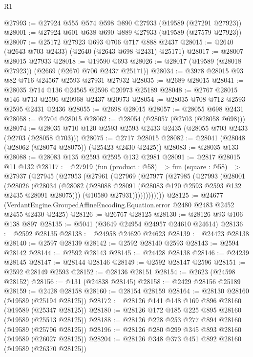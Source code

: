 \begin{lexlean}{R1}
\begin{coremodule}
@27993 := @27924 @555 @574 @598 @890 @27933 (@19589 (@27291 @27923))
@28001 := @27924 @601 @638 @690 @889 @27933 (@19589 (@27579 @27923))
@28007 := @25172 @27923 @693 @706 @717 @888 @2437
@28015 := @2640 (@2643 @703 @2433) (@2640 (@2643 @698 @2431) @25171)
@28017 := @28007 @28015 @27933
@28018 := @19590 @693
@28026 := @28017 (@19589 (@28018 @27923)) (@2669 (@2670 @706 @2437 @25171))
@28034 := @3978 @28015 @93 @82 @716 @24567 @2593 @27931 @27932
@28035 := @2689 @28015
@28041 := @28035 @714 @136 @24565 @2596 @20973 @25189
@28048 := @2767 @28015 @146 @713 @2596 @20968 @2437 @20973
@28054 := @28035 @708 @712 @2593 @2595 @2431 @2436
@28055 := @2698 @28015
@28057 := @28055 @698 @2431
@28058 := @2704 @28015
@28062 := @28054 (@28057 (@2703 (@28058 @698)))
@28074 := @28035 @710 @120 @2593 @2593 @2433 @2435 (@28055 @703 @2433 (@2703 (@28058 @703)))
@28075 := @2717 @28015
@28082 := @28041 (@28048 (@28062 (@28074 @28075)) (@25423 @2430 @2425))
@28083 := @28035 @133
@28088 := @28083 @135 @2593 @2595 @132 @2981
@28091 := @2817 @28015 @11 @132
@28117 := @27919
    (fun (product : @58) =>
    fun (square : @58) =>
    @27937
      (@27945
        (@27953
          (@27961
            (@27969
              (@27977
                (@27985
                  (@27993
                    (@28001
                      (@28026
                        (@28034
                          (@28082
                            (@28088 @28091 (@28083 @120 @2593 @2593 @132 @2435 @28091 @28075)))
                          (@10580 @27931))))))))))))
@28125 := @24677
    (VerdantEngine.GroupedAffineEncoding.Equation.error @2480 @2483 @2452 @2455 @2430 @2425)
@28126 := @26767 @28125
@28130 := @28126 @93 @106 @138 @897
@28135 := @5041 (@3649 @24954 @24957 @24610 @24614)
@28136 := @2592 @28135
@28138 := @24958 @24620 @24623
@28139 := @24423 @28138
@28140 := @2597 @28139
@28142 := @2592 @28140 @2593
@28143 := @2594 @28142
@28144 := @2592 @28143
@28145 := @24428 @28138
@28146 := @24239 @28145
@28147 := @28144 @28146
@28149 := @2592 @28147 @2596
@28151 := @2592 @28149 @2593
@28152 := @28136 @28151
@28154 := @2623 (@24598 @28152)
@28156 := @131 (@24838 @28145)
@28158 := @2429 @28156 @25189
@28159 := @2428 @28158
@28160 := @28154 @28159
@28164 := @28130 @28160 (@19589 (@25194 @28125))
@28172 := @28126 @141 @148 @169 @896 @28160 (@19589 (@25347 @28125))
@28180 := @28126 @172 @185 @225 @895 @28160 (@19589 (@25513 @28125))
@28188 := @28126 @228 @253 @277 @894 @28160 (@19589 (@25796 @28125))
@28196 := @28126 @280 @299 @345 @893 @28160 (@19589 (@26027 @28125))
@28204 := @28126 @348 @373 @451 @892 @28160 (@19589 (@26370 @28125))

\end{coremodule}
\end{lexlean}
